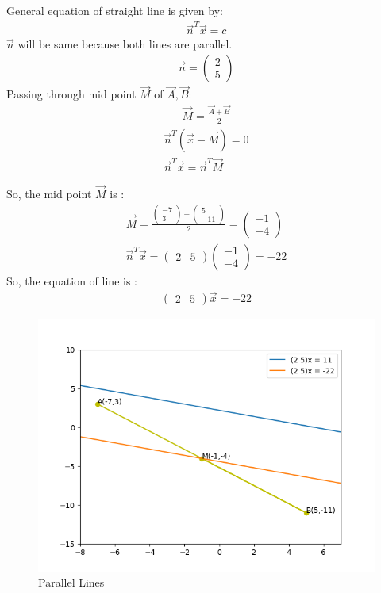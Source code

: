 General equation of straight line is given by:\\
\begin{align}
    \vec{n}^T \vec{x} = c 
\end{align}   
\vspace{0.5 cm}
$\vec{n}$ will be same because both lines are parallel. \\
\begin{align}
    \vec{n} = \begin{pmatrix} 2  \\ 5 \end{pmatrix}
\end{align}
Passing through mid point $\vec{M}$ of $\vec{A}, \vec{B}$:
\begin{align}
  \vec{M} = \frac{ \vec{A} + \vec{B}}{2}
\end{align}
\begin{align}
    \vec{n}^T (\vec{x} - \vec{M}) = 0 \\
    \vec{n}^T \vec{x} = \vec{n}^T \vec{M} 
\end{align}

So, the mid point $\vec{M}$ is :
\begin{align}
   \vec{M} = \frac{\begin{pmatrix} -7  \\ 3 \end{pmatrix} + \begin{pmatrix} 5 \\ -11 \end{pmatrix}}{2}  = \begin{pmatrix} -1  \\ -4 \end{pmatrix}  \\
   \vec{n}^T \vec{x} =  \begin{pmatrix} 2 & 5 \end{pmatrix}\begin{pmatrix} -1  \\ -4 \end{pmatrix} = -22
\end{align}
So, the equation of line is :
\begin{align}
   \begin{pmatrix} 2 & 5 \end{pmatrix}\vec{x} = -22
\end{align}

\begin{figure}[t]
    \centering
    \includegraphics[width = \columnwidth]{./solutions/2/2/15/AI_assignment_2.png}
    \caption{Parallel Lines}
    \label{eq:solutions/2/2/15/fig:Lines}
\end{figure}

